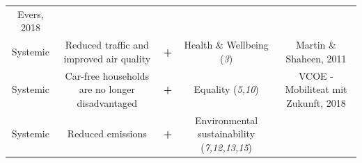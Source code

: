 \documentclass[
]{book}
\begin{document}
\begin{longtable}[]{@{}ccccc@{}}
\begin{minipage}[t]{0.17\columnwidth}
Evers, 2018\strut
\end{minipage}\tabularnewline
\begin{minipage}[t]{0.17\columnwidth}\centering
Systemic\strut
\end{minipage} & \begin{minipage}[t]{0.16\columnwidth}\centering
Reduced traffic and improved air quality\strut
\end{minipage} & \begin{minipage}[t]{0.17\columnwidth}\centering
\textbf{+}\strut
\end{minipage} & \begin{minipage}[t]{0.17\columnwidth}\centering
Health \& Wellbeing (\emph{3})\strut
\end{minipage} & \begin{minipage}[t]{0.17\columnwidth}\centering
Martin \& Shaheen, 2011\strut
\end{minipage}\tabularnewline
\begin{minipage}[t]{0.17\columnwidth}\centering
Systemic\strut
\end{minipage} & \begin{minipage}[t]{0.16\columnwidth}\centering
Car-free households are no longer disadvantaged\strut
\end{minipage} & \begin{minipage}[t]{0.17\columnwidth}\centering
\textbf{+}\strut
\end{minipage} & \begin{minipage}[t]{0.17\columnwidth}\centering
Equality (\emph{5,10})\strut
\end{minipage} & \begin{minipage}[t]{0.17\columnwidth}\centering
VCOE - Mobiliteat mit Zukunft, 2018\strut
\end{minipage}\tabularnewline
\begin{minipage}[t]{0.17\columnwidth}\centering
Systemic\strut
\end{minipage} & \begin{minipage}[t]{0.16\columnwidth}\centering
Reduced emissions\strut
\end{minipage} & \begin{minipage}[t]{0.17\columnwidth}\centering
\textbf{+}\strut
\end{minipage} & \begin{minipage}[t]{0.17\columnwidth}\centering
Environmental sustainability (\emph{7,12,13,15})\strut
\end{minipage} & \begin{minipage}[t]{0.17\columnwidth}\centering

\end{minipage}
\end{longtable}
\end{document}
